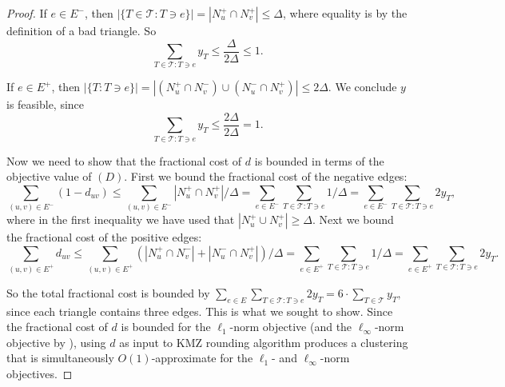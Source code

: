 \begin{proof}
If $e \in E^-$, then $|\{T \in \mathcal{T}: T \ni e\}| = |N_u^+ \cap N_v^+| \leq \Delta$, where equality is by the definition of a bad triangle. So 
\[\sum_{T \in \mathcal{T}: T \ni e} y_T  \leq \frac{\Delta}{2\Delta} \leq 1.\]


If $e \in E^+$, then $|\{T : T \ni e\}| = |(N_u^+ \cap N_v^-) \cup (N_u^- \cap N_v^+)| \leq 2\Delta$. We conclude $y$ is feasible, since
\[\sum_{T \in \mathcal{T}: T \ni e} y_T  \leq \frac{2\Delta}{2\Delta} = 1.\]
 

Now we need to show that the fractional cost of $d$ is bounded in terms of the objective value of $(D)$. First we bound the fractional cost of the negative edges:
\[\sum_{(u,v) \in E^-}(1-d_{uv}) \leq \sum_{(u,v)\in E^-} |N_u^+ \cap N_v^+|/\Delta= \sum_{e \in E^-} \sum_{T \in \mathcal{T}: T \ni e} 1/\Delta = \sum_{e \in E^-} \sum_{T \in \mathcal{T}: T \ni e} 2y_T,\]
where in the first inequality we have used that $|N_u^+ \cup N_v^+| \geq \Delta$. Next we bound the fractional cost of the positive edges:
\[\sum_{(u,v) \in E^+}d_{uv} \leq \sum_{(u,v)\in E^+} (|N_u^+ \cap N_v^-| + |N_u^- \cap N_v^+|)/\Delta = \sum_{e \in E^+} \sum_{T \in \mathcal{T}: T \ni e} 1/\Delta = \sum_{e \in E^+} \sum_{T \in \mathcal{T}: T \ni e} 2y_T. \]

So the total fractional cost is bounded by 
$\sum_{e \in E} \sum_{T \in \mathcal{T}: T \ni e} 2 y_T = 6 \cdot \sum_{T \in \mathcal{T}} y_T,$
since each triangle contains three edges. This is what we sought to show. Since the fractional cost of $d$ is bounded for the $\ell_1$-norm objective (and the $\ell_{\infty}$-norm objective by \cite{DMN23}), using $d$ as input to KMZ rounding algorithm produces a clustering that is simultaneously $O(1)$-approximate for the $\ell_1$- and $\ell_{\infty}$-norm objectives.  
\end{proof}


